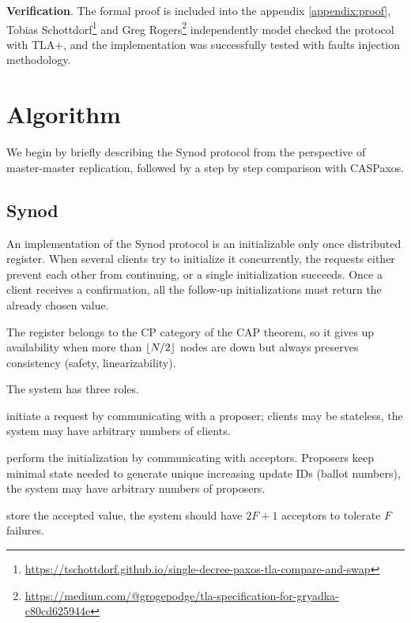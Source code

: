 \documentclass[12pt]{article}
\theoremstyle{definition}
\DeclarePairedDelimiter{\floor}{\lfloor}{\rfloor}
\begin{document}
{\bf Verification}. The formal proof is included into the appendix \ref{appendix:proof}, Tobias Schottdorf\footnote{\href{https://tschottdorf.github.io/single-decree-paxos-tla-compare-and-swap}{https://tschottdorf.github.io/single-decree-paxos-tla-compare-and-swap}} and Greg Rogers\footnote{\href{https://medium.com/@grogepodge/tla-specification-for-gryadka-c80cd625944e}{https://medium.com/@grogepodge/tla-specification-for-gryadka-c80cd625944e}} independently model checked the protocol with TLA+, and the implementation was successfully tested with faults injection methodology.

\section{Algorithm}

We begin by briefly describing the Synod protocol from the perspective of master-master replication, followed by a step by step comparison with CASPaxos.

\subsection{Synod}

An implementation of the Synod protocol is an initializable only once distributed register. When several clients try to initialize it concurrently, the requests either prevent each other from continuing, or a single initialization succeeds. Once a client receives a confirmation, all the follow-up initializations must return the already chosen value.

The register belongs to the CP category of the CAP theorem, so it gives up availability when more than $\floor{N/2}$ nodes are down but always preserves consistency (safety, linearizability).

The system has three roles.

\begin{description}[align=left]
  \item [Clients] initiate a request by communicating with a proposer; clients may be stateless, the system may have arbitrary numbers of clients.
  \item [Proposers] perform the initialization by communicating with acceptors. Proposers keep minimal state needed to generate unique increasing update IDs (ballot numbers), the system may have arbitrary numbers of proposers.
  \item [Acceptors] store the accepted value, the system should have $2F+1$ acceptors to tolerate $F$ failures.
\end{description}
\end{document}
